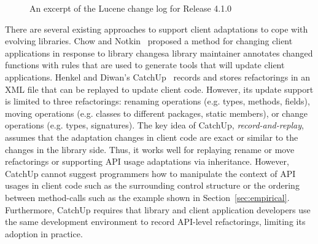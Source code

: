 \documentclass[runningheads,a4paper]{llncs}
\begin{document}
\begin{figure}
\centering
{}
\caption{An excerpt of the Lucene change log for Release 4.1.0~\cite{releasenote}}
\label{fig:releasenote}
\end{figure}









There are several existing approaches to support client adaptations to cope with evolving libraries.  Chow and Notkin~\cite{Chow1996} proposed a method for changing client applications in response to library changes\textemdash a library maintainer annotates changed functions with rules that are used to generate tools that will update client applications. Henkel and Diwan's CatchUp~\cite{Henkel2005} records and stores refactorings in an XML file that can be replayed to update client code. However, its update support is limited to three refactorings: renaming operations (e.g.  types, methods, fields), moving operations (e.g. classes to different packages, static members), or change operations (e.g. types, signatures). The key idea of CatchUp, {\em record-and-replay}, assumes that the adaptation changes in client code are exact or similar to the changes in the library side. Thus, it works well for replaying rename or move refactorings or supporting API usage adaptations via inheritance. However, CatchUp cannot suggest programmers how to manipulate the context of API usages in client code such as the surrounding control structure or the ordering between method-calls such as the example shown in Section~\ref{sec:empirical}. Furthermore, CatchUp requires that library and client application developers use the same development environment to record API-level refactorings, limiting its adoption in practice.
\end{document}

